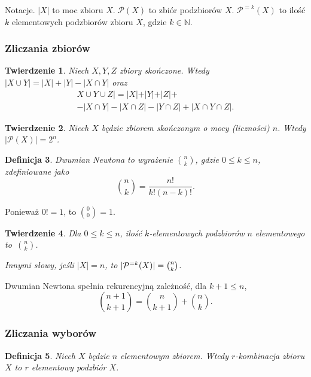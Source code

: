 \documentclass[12pt]{article}
\newcommand{\cP}{\mathcal{P}}
\newcommand{\bN}{\mathbb{N}}
\newtheorem{thm}{Twierdzenie}
\newtheorem{dfn}[thm]{Definicja}
\begin{document}
Notacje. $|X|$ to moc zbioru $X$.
$\cP(X)$ to zbiór podzbiorów $X$.
$\cP^{=k}(X)$ to ilość $k$ elementowych podzbiorów 
zbioru $X$, gdzie $k\in\bN$.

\subsubsection{Zliczania zbiorów}



\begin{thm}
	Niech $X,Y, Z$ zbiory skończone. Wtedy 
		$|X\cup Y|=|X|+|Y|-|X\cap Y|$ oraz
		 \begin{multline*}
		 	X\cup Y\cup Z|= |X|+|Y|+|Z|+ \\
		 	- |X\cap Y| - |X\cap Z| - |Y\cap Z| + |X\cap Y\cap Z|.
		 \end{multline*} 
\end{thm}

\begin{thm}
	Niech $X$ będzie zbiorem skończonym o mocy (liczności) $n$. 
	Wtedy $|\cP(X)|=2^n$.
\end{thm}

\begin{dfn}
	Dwumian Newtona to wyrażenie $\binom{n}{k}$, gdzie $0\leq k\leq n$, zdefiniowane jako
	\[
	\binom{n}{k}=\frac{n!}{k!(n-k)!}.
	\]
\end{dfn}
Ponieważ $0!=1$, to $\binom{0}{0}=1$.

\begin{thm}
	Dla $0\leq k \leq n$, ilość $k$-elementowych podzbiorów
	$n$ elementowego to~$\binom{n}{k}$. 
	
	Innymi słowy, jeśli $|X|=n$, 
	to $|\cP\sp{=k}(X)|=\binom{n}{k}$.
\end{thm}

Dwumian Newtona spełnia rekurencyjną zależność,
dla $k+1\leq n$, 
\[
\binom{n+1}{k+1} = \binom{n}{k+1} + \binom{n}{k}.  
\]

\subsubsection{Zliczania wyborów}


\begin{dfn}
	Niech $X$ będzie $n$ elementowym zbiorem.
	Wtedy $r$-kombinacja  zbioru $X$ to $r$ elementowy podzbiór $X$.
\end{dfn} 
\end{document}
